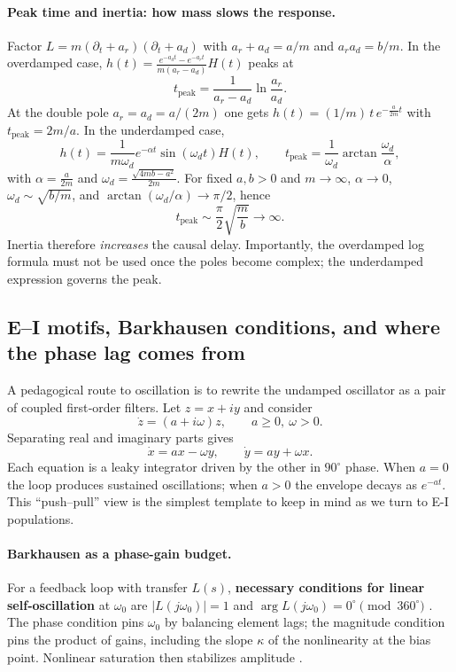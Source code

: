 \paragraph{Peak time and inertia: how mass slows the response.}
Factor \(L=m(\partial_t+a_r)(\partial_t+a_d)\) with \(a_r+a_d=a/m\) and \(a_r a_d=b/m\). In the overdamped case, \(h(t)=\frac{e^{-a_d t}-e^{-a_r t}}{m(a_r-a_d)}H(t)\) peaks at
\[
t_{\mathrm{peak}}=\frac{1}{a_r-a_d}\ln\!\frac{a_r}{a_d}.
\]
At the double pole \(a_r=a_d=a/(2m)\) one gets \(h(t)=(1/m)\,t\,e^{-\frac{a}{2m}t}\) with \(t_{\mathrm{peak}}=2m/a\). In the underdamped case,
\[
h(t)=\frac{1}{m\omega_d}e^{-\alpha t}\sin(\omega_d t)H(t),\qquad
t_{\mathrm{peak}}=\frac{1}{\omega_d}\arctan\!\frac{\omega_d}{\alpha},
\]
with \(\alpha=\tfrac{a}{2m}\) and \(\omega_d=\tfrac{\sqrt{4mb-a^2}}{2m}\). For fixed \(a,b>0\) and \(m\to\infty\), \(\alpha\to0\), \(\omega_d\sim \sqrt{b/m}\), and \(\arctan(\omega_d/\alpha)\to\pi/2\), hence
\[
t_{\mathrm{peak}}\sim \frac{\pi}{2}\sqrt{\frac{m}{b}}\to\infty.
\]
Inertia therefore \emph{increases} the causal delay. Importantly, the overdamped log formula must not be used once the poles become complex; the underdamped expression governs the peak.
 


\subsection{E--I motifs, Barkhausen conditions, and where the phase lag comes from} \label{app:barkhausen}
A pedagogical route to oscillation is to rewrite the undamped oscillator as a pair of coupled first‑order filters. Let \(z=x+i y\) and consider
\[
\dot z=(a+i\omega)z,\qquad a\ge0,\ \omega>0.
\]
Separating real and imaginary parts gives
\[
\dot x=a x-\omega y,\qquad \dot y=a y+\omega x.
\]
Each equation is a leaky integrator driven by the other in \(90^\circ\) phase. When \(a=0\) the loop produces sustained oscillations; when \(a>0\) the envelope decays as \(e^{-a t}\). This ``push--pull'' view is the simplest template to keep in mind as we turn to E-I populations.

\paragraph{Barkhausen as a phase-gain budget.}
For a feedback loop with transfer \(L(s)\), \textbf{necessary conditions for linear self‑oscillation} at \(\omega_0\) are \(|L(j\omega_0)|=1\) and \(\arg L(j\omega_0)=0^\circ \pmod{360^\circ}\) \cite{vonWangenheim2010}. The phase condition pins \(\omega_0\) by balancing element lags; the magnitude condition pins the product of gains, including the slope \(\kappa\) of the nonlinearity at the bias point. Nonlinear saturation then stabilizes amplitude \cite{AstromMurray2008}.

